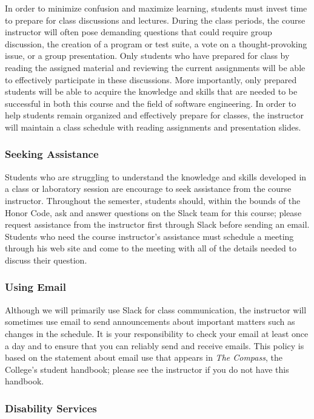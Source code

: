 \documentclass[11pt]{article}
\newcommand{\instructorpronoun}[1]{his}
\begin{document}
In order to minimize confusion and maximize learning, students must invest time to prepare for class discussions and
lectures. During the class periods, the course instructor will often pose demanding questions that could require group
discussion, the creation of a program or test suite, a vote on a thought-provoking issue, or a group presentation. Only
students who have prepared for class by reading the assigned material and reviewing the current assignments will be able
to effectively participate in these discussions. More importantly, only prepared students will be able to acquire the
knowledge and skills that are needed to be successful in both this course and the field of software engineering. In
order to help students remain organized and effectively prepare for classes, the instructor will maintain a class
schedule with reading assignments and presentation slides.

\subsubsection*{Seeking Assistance}

Students who are struggling to understand the knowledge and skills developed in a class or laboratory session are
encourage to seek assistance from the course instructor. Throughout the semester, students should, within the bounds of
the Honor Code, ask and answer questions on the Slack team for this course; please request assistance from the
instructor first through Slack before sending an email. Students who need the course instructor's assistance must
schedule a meeting through \instructorpronoun{} web site and come to the meeting with all of the details needed to
discuss their question.

\subsubsection*{Using Email}

Although we will primarily use Slack for class communication, the instructor will sometimes use email to send
announcements about important matters such as changes in the schedule. It is your responsibility to check your email at
least once a day and to ensure that you can reliably send and receive emails. This policy is based on the statement
about email use that appears in {\em The Compass}, the College's student handbook; please see the instructor if you do
not have this handbook.

\subsubsection*{Disability Services}
\end{document}
